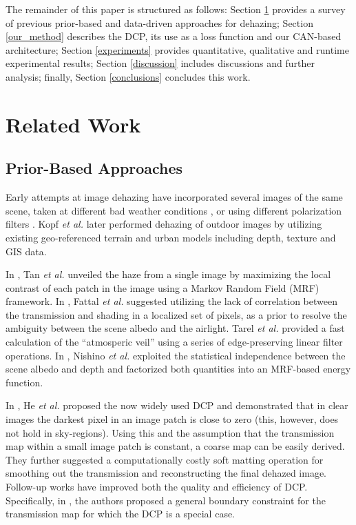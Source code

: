 \documentclass[10pt,twocolumn,twoside]{IEEEtran}
\begin{document}
The remainder of this paper is structured as follows: Section \ref{s:related_work} provides a survey of previous prior-based and data-driven approaches for dehazing; Section \ref{our_method} describes the DCP, its use as a loss function and our CAN-based architecture; Section \ref{experiments} provides quantitative, qualitative and runtime experimental results; Section \ref{discussion} includes discussions and further analysis; finally, Section \ref{conclusions} concludes this work.

\section{Related Work}\label{s:related_work}

\subsection{Prior-Based Approaches}
Early attempts at image dehazing have incorporated several images of the same scene, taken at different bad weather conditions \cite{multiple_image_dehazing}, or using different polarization filters  \cite{multiple_polar_dehazing}. Kopf \textit{et al.} \cite{dehazing_with_depth} later performed dehazing of outdoor images by utilizing existing geo-referenced terrain and urban models including depth, texture and GIS data.

In \cite{contrast_tan}, Tan \textit{et al.} unveiled the haze from a single image by maximizing the local contrast of each patch in the image using a Markov Random Field (MRF) framework. In \cite{fattal_dehazing}, Fattal \textit{et al.} suggested utilizing the lack of correlation between the transmission and shading in a localized set of pixels, as a prior to resolve the ambiguity between the scene albedo and the airlight.
Tarel \textit{et al.} \cite{tarel_dehazing} provided a fast calculation of the ``atmosperic veil'' using a series of edge-preserving linear filter operations. In \cite{nishino_dehazing}, Nishino \textit{et al.} exploited the statistical independence between the scene albedo and depth and factorized both quantities into an MRF-based energy function. 

In \cite{DCP}, He \textit{et al.} proposed the now widely used DCP and demonstrated that in clear images the darkest pixel in an image patch is close to zero (this, however, does not hold in sky-regions).
Using this and the assumption that the transmission map within a small image patch is constant, a coarse map can be easily derived. They further suggested a computationally costly soft matting operation for smoothing out the transmission and reconstructing the final dehazed image. Follow-up works have improved both the quality and efficiency of DCP. Specifically, in \cite{BCCR}, the authors proposed a general boundary constraint for the transmission map for which the DCP is a special case.
\end{document}

